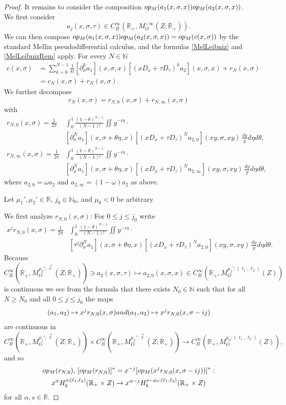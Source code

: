 \documentclass[10pt,a4paper]{amsart}
\def\N{\mathbb N}
\def\R{\mathbb R}
\def\opm{\textup{op}_{\textit{M}}}
\begin{document}
\begin{proof}
It remains to consider the composition $\opm(a_1(x,\sigma,x))\opm(a_2(x,\sigma,x))$. We first consider
$$
a_j(x,\sigma,\tau)  \in C^{\infty}_B(\R_+,M^{-\infty}_{O}(Z;\overline{\R}_+)).
$$
We can then compose $\opm(a_1(x,\sigma,x))\opm(a_2(x,\sigma,x)) = \opm(c(x,\sigma))$ by the standard Mellin pseudodifferential calculus, and the formulas \eqref{MelLeibniz} and \eqref{MelLeibnizRem} apply. For every $N \in \N$
\begin{align*}
c(x,\sigma) &= \sum\limits_{k=0}^{N-1}\frac{1}{k!}[\partial_{\sigma}^ka_1](x,\sigma,x)[(xD_x + \tau D_{\tau})^ka_2](x,\sigma,x) + r_N(x,\sigma) \\
&= c_N(x,\sigma) + r_{N}(x,\sigma).
\end{align*}
We further decompose
$$
r_N(x,\sigma) = r_{N,0}(x,\sigma) + r_{N,\infty}(x,\sigma)
$$
with
\begin{align*}
r_{N,0}(x,\sigma) = \frac{1}{2\pi}\! &\int_0^1\!\frac{(1-\theta)^{N-1}}{(N-1)!} \iint y^{-i\eta} \cdot \\
&[\partial_{\sigma}^Na_1](x,\sigma+\theta\eta,x) [(xD_{x} + \tau D_{\tau})^Na_{2,0}](xy,\sigma,xy)\,\frac{dy}{y}d\eta d\theta, \\
r_{N,\infty}(x,\sigma) = \frac{1}{2\pi}\! &\int_0^1\!\frac{(1-\theta)^{N-1}}{(N-1)!} \iint y^{-i\eta} \cdot \\
&[\partial_{\sigma}^Na_1](x,\sigma+\theta\eta,x) [(xD_{x} + \tau D_{\tau})^Na_{2,\infty}](xy,\sigma,xy)\,\frac{dy}{y}d\eta d\theta,
\end{align*}
where $a_{2,0} = \omega a_2$ and $a_{2,\infty} = (1-\omega)a_2$ as above.

\medskip

\noindent
Let $\mu_1',\mu_2' \in \R$, $j_0 \in \N_0$, and $\mu_0 < 0$ be arbitrary.

We first analyze $r_{N,0}(x,\sigma)$: For $0 \leq j \leq j_0$ write
\begin{align*}
x^jr_{N,0}(x,\sigma) = \frac{1}{2\pi}\! &\int_0^1\!\frac{(1-\theta)^{N-1}}{(N-1)!} \iint y^{-i\eta} \cdot \\
&[\tau^j\partial_{\sigma}^Na_1](x,\sigma+\theta\eta,x) [(xD_{x} + \tau D_{\tau})^Na_{2,0}](xy,\sigma,xy)\,\frac{dy}{y}d\eta d\theta.
\end{align*}
Because
$$
C^{\infty}_B(\R_+,M^{\mu_2';\vec{\ell}}_{O}(Z;\overline{\R}_+)) \ni a_2(x,\sigma,\tau) \mapsto a_{2,0}(x,\sigma,x) \in C^{\infty}_B(\R_+,M^{\mu_2';(\ell_1,\ell_2)}_{O}(Z))
$$
is continuous we see from the formula that there exists $N_0 \in \N$ such that for all $N \geq N_0$ and all $0 \leq j \leq j_0$ the maps
$$
(a_1,a_2) \mapsto x^jr_{N,0}(x,\sigma) \textup{ and } (a_1,a_2) \mapsto x^jr_{N,0}(x,\sigma-ij)
$$
are continuous in
$$
C^{\infty}_B(\R_+,M^{\mu_1';\vec{\ell}}_{O}(Z;\overline{\R}_+)) \times C^{\infty}_B(\R_+,M^{\mu_2';\vec{\ell}}_{O}(Z;\overline{\R}_+)) \to C^{\infty}_B(\R_+,M^{\mu_0;(\ell_1,\ell_2)}_{O}(Z)),
$$
and so
\begin{gather*}
\opm(r_{N,0}),\, [\opm(r_{N,0})]^* = x^{-j} [\opm(x^jr_{N,0}(x,\sigma-ij))]^* : \\
x^{\alpha}H^{s;(\ell_1,\ell_2)}_b(\R_+\times Z) \to x^{\alpha-j}H^{s-\mu_0;(\ell_1,\ell_2)}_b(\R_+\times Z)
\end{gather*}
for all $\alpha,s \in \R$.


\end{proof}
\end{document}
